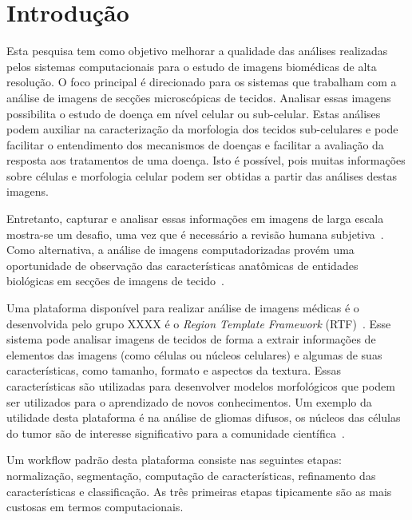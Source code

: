 \documentclass[a4paper,10pt]{article}
\begin{document}
	
	
\section{Introdução}


Esta pesquisa tem como objetivo melhorar a qualidade das análises realizadas pelos sistemas computacionais para o estudo de imagens biomédicas de alta resolução. O foco principal é direcionado para os sistemas que trabalham com a análise de imagens de secções microscópicas de tecidos. Analisar essas imagens possibilita o estudo de doença em nível celular ou sub-celular. Estas análises podem auxiliar na caracterização da morfologia dos tecidos sub-celulares e pode facilitar o entendimento dos mecanismos de doenças e facilitar a avaliação da resposta aos tratamentos de uma doença. Isto é possível, pois muitas informações sobre células e morfologia celular podem ser obtidas a partir das análises destas imagens.

Entretanto, capturar e analisar essas informações em imagens de larga escala mostra-se um desafio, uma vez que é necessário a revisão humana subjetiva~\cite{kong2011comprehensive}. Como alternativa, a análise de imagens computadorizadas provém uma oportunidade de observação das características anatômicas de entidades biológicas em secções de imagens de tecido~\cite{kong2010texture}.

Uma plataforma disponível para realizar análise de imagens médicas é o desenvolvida pelo grupo XXXX é o \textit{Region Template Framework} (RTF)~\cite{teodoro2014region}. Esse sistema pode analisar imagens de tecidos de forma a extrair informações de elementos das imagens (como células ou núcleos celulares) e algumas de suas características, como tamanho, formato e aspectos da textura. Essas características são utilizadas para desenvolver modelos morfológicos que podem ser utilizados para o aprendizado de novos conhecimentos. Um exemplo da utilidade desta plataforma é na análise de gliomas difusos, os núcleos das células do tumor são de interesse significativo para a comunidade científica~\cite{gupta2005clarifying}.

Um workflow padrão desta plataforma consiste nas seguintes etapas: normalização, segmentação, computação de características, refinamento das características e classificação. As três primeiras etapas tipicamente são as mais custosas em termos computacionais. 
\end{document}
